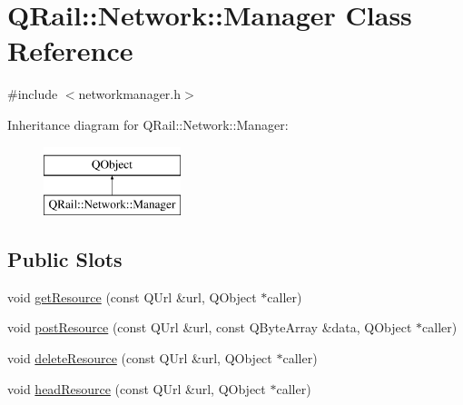 \hypertarget{classQRail_1_1Network_1_1Manager}{}\section{Q\+Rail\+::Network\+::Manager Class Reference}
\label{classQRail_1_1Network_1_1Manager}


{\ttfamily \#include $<$networkmanager.\+h$>$}

Inheritance diagram for Q\+Rail\+::Network\+::Manager\+:\begin{figure}[H]
\begin{center}
\leavevmode
\includegraphics[height=2.000000cm]{classQRail_1_1Network_1_1Manager}
\end{center}
\end{figure}
\subsection*{Public Slots}
\begin{DoxyCompactItemize}
\item 
void \mbox{\hyperlink{classQRail_1_1Network_1_1Manager_af6dfa87af8f58dc2506ef97247c95037}{get\+Resource}} (const Q\+Url \&url, Q\+Object $\ast$caller)
\item 
void \mbox{\hyperlink{classQRail_1_1Network_1_1Manager_a7f479ad3bcff90ffba6fab969294c338}{post\+Resource}} (const Q\+Url \&url, const Q\+Byte\+Array \&data, Q\+Object $\ast$caller)
\item 
void \mbox{\hyperlink{classQRail_1_1Network_1_1Manager_a67ba7523afcb7f97842bb6626a81166d}{delete\+Resource}} (const Q\+Url \&url, Q\+Object $\ast$caller)
\item 
void \mbox{\hyperlink{classQRail_1_1Network_1_1Manager_adde10f409e9b77b59b145fd2609244a7}{head\+Resource}} (const Q\+Url \&url, Q\+Object $\ast$caller)
\end{DoxyCompactItemize}
